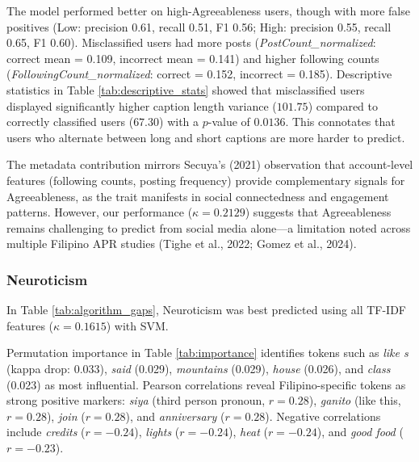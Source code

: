 The model performed better on high-Agreeableness users, though with more false positives (Low: precision 0.61, recall 0.51, F1 0.56; High: precision 0.55, recall 0.65, F1 0.60). Misclassified users had more posts (\textit{PostCount\_normalized}: correct mean = 0.109, incorrect mean = 0.141) and higher following counts (\textit{FollowingCount\_normalized}: correct = 0.152, incorrect = 0.185). Descriptive statistics in Table \ref{tab:descriptive_stats} showed that misclassified users displayed significantly higher 
caption length variance ($101.75$) compared to correctly classified users ($67.30$) 
with a $p$-value of $0.0136$. This connotates that users who alternate between long and short captions are more harder to predict. 

The metadata contribution mirrors Secuya's (2021) observation that account-level features (following counts, posting frequency) provide complementary signals for Agreeableness, as the trait manifests in social connectedness and engagement patterns. However, our performance ($\kappa = 0.2129$) suggests that Agreeableness remains challenging to predict from social media alone—a limitation noted across multiple Filipino APR studies (Tighe et al., 2022; Gomez et al., 2024).

\subsubsection{Neuroticism}

In Table \ref{tab:algorithm_gaps}, Neuroticism was best predicted using all TF-IDF  features ($\kappa = 0.1615$) with SVM.

Permutation importance in Table \ref{tab:importance} identifies tokens such as \textit{like s} (kappa drop: 0.033), \textit{said} (0.029), \textit{mountains} (0.029), \textit{house} (0.026), and \textit{class} (0.023) as most influential. Pearson correlations reveal Filipino-specific tokens as strong positive markers: \textit{siya} (third person pronoun, $r = 0.28$), \textit{ganito} (like this, $r = 0.28$), \textit{join} ($r = 0.28$), and \textit{anniversary} ($r = 0.28$). Negative correlations include \textit{credits} ($r = -0.24$), \textit{lights} ($r = -0.24$), \textit{heat} ($r = -0.24$), and \textit{good food} ($r = -0.23$).

